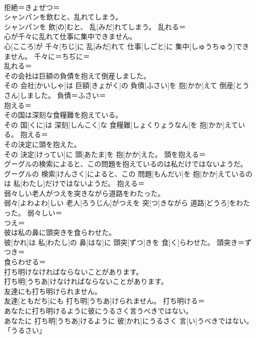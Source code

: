 \documentclass[8pt]{extreport}
\begin{document}
\begin{CJK}{UTF8}{min}
\\	拒絶＝きょぜつ＝ 
\\	シャンパンを飲むと、乱れてしまう。	
\\	シャンパンを 飲[の]むと、 乱[みだ]れてしまう。	乱れる＝ 
\\	心が千々に乱れて仕事に集中できません。	
\\	心[こころ]が 千々[ちじ]に 乱[みだ]れて 仕事[しごと]に 集中[しゅうちゅう]できません。	千々に＝ちぢに＝ 
\\	乱れる＝ 
\\	その会社は巨額の負債を抱えて倒産しました。	
\\	その 会社[かいしゃ]は 巨額[きょがく]の 負債[ふさい]を 抱[かか]えて 倒産[とうさん]しました。	負債＝ふさい＝ 
\\	抱える＝ 
\\	その国は深刻な食糧難を抱えている。	
\\	その 国[くに]は 深刻[しんこく]な 食糧難[しょくりょうなん]を 抱[かか]えている。	抱える＝ 
\\	その決定に頭を抱えた。	
\\	その 決定[けってい]に 頭[あたま]を 抱[かか]えた。	頭を抱える＝ 
\\	グーグルの検索によると、この問題を抱えているのは私だけではないようだ。	
\\	グーグルの 検索[けんさく]によると、この 問題[もんだい]を 抱[かか]えているのは 私[わたし]だけではないようだ。	抱える＝ 
\\	弱々しい老人がつえを突きながら道路をわたった。	
\\	弱々[よわよわ]しい 老人[ろうじん]がつえを 突[つ]きながら 道路[どうろ]をわたった。	弱々しい＝ 
\\	つえ＝ 
\\	彼は私の鼻に頭突きを食らわせた。	
\\	彼[かれ]は 私[わたし]の 鼻[はな]に 頭突[ずつ]きを 食[く]らわせた。	頭突き＝ずつき＝ 
\\	食らわせる＝ 
\\	打ち明けなければならないことがあります。	
\\	打ち明[うちあ]けなければならないことがあります。	
\\	友達にも打ち明けられません。	
\\	友達[ともだち]にも 打ち明[うちあ]けられません。	打ち明ける＝ 
\\	あなたに打ち明けるように彼にうるさく言うべきではない。	
\\	あなたに 打ち明[うちあ]けるように 彼[かれ]にうるさく 言[い]うべきではない。	
\\	「うるさい」

\end{CJK}
\end{document}
